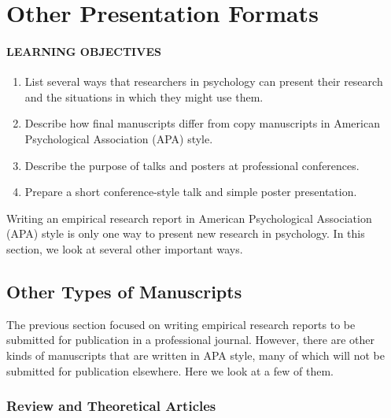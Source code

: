 \documentclass[
]{krantz}
\providecommand{\tightlist}{%
  \setlength{\itemsep}{0pt}\setlength{\parskip}{0pt}}
\begin{document}
\hypertarget{other-presentation-formats}{%
\section{Other Presentation Formats}\label{other-presentation-formats}}

\hypertarget{learning-objectives-34}{%
\paragraph*{LEARNING OBJECTIVES}\label{learning-objectives-34}}

\begin{enumerate}
\def\labelenumi{\arabic{enumi}.}
\tightlist
\item
  List several ways that researchers in psychology can present their research and the situations in which they might use them.
\item
  Describe how final manuscripts differ from copy manuscripts in American Psychological Association (APA) style.
\item
  Describe the purpose of talks and posters at professional conferences.
\item
  Prepare a short conference-style talk and simple poster presentation.
\end{enumerate}

Writing an empirical research report in American Psychological Association (APA) style is only one way to present new research in psychology. In this section, we look at several other important ways.

\hypertarget{other-types-of-manuscripts}{%
\subsection*{Other Types of Manuscripts}\label{other-types-of-manuscripts}}


The previous section focused on writing empirical research reports to be submitted for publication in a professional journal. However, there are other kinds of manuscripts that are written in APA style, many of which will not be submitted for publication elsewhere. Here we look at a few of them.

\hypertarget{review-and-theoretical-articles}{%
\subsubsection*{Review and Theoretical Articles}\label{review-and-theoretical-articles}}
\end{document}
